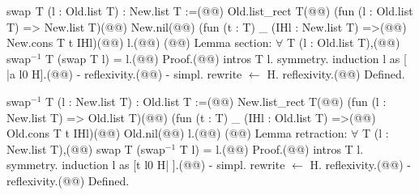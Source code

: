 swap$\phantom{^{2}}$T (l : Old.list T) : New.list T :=(@\vspace{-0.04cm}@)
  Old.list_rect T(@\vspace{-0.04cm}@)
    (fun (l : Old.list T) => New.list T)(@\vspace{-0.04cm}@)
    New.nil(@\vspace{-0.04cm}@)
    (fun (t : T) _ (IHl : New.list T) =>(@\vspace{-0.04cm}@)
      New.cons T t IHl)(@\vspace{-0.04cm}@)
    l.(@\vspace{-0.04cm}@)
(@\vspace{-0.04cm}@)
Lemma section: $\forall$ T (l : Old.list T),(@\vspace{-0.04cm}@)
  swap$^{-1}$ T (swap T l) = l.(@\vspace{-0.04cm}@)
Proof.(@\vspace{-0.04cm}@)
  intros T l. symmetry. induction l as [ |a l0 H].(@\vspace{-0.04cm}@)
  - reflexivity.(@\vspace{-0.04cm}@)
  - simpl. rewrite $\leftarrow$ H. reflexivity.(@\vspace{-0.04cm}@)
Defined.

swap$^{-1}$ T (l : New.list T) : Old.list T :=(@\vspace{-0.04cm}@)
  New.list_rect T(@\vspace{-0.04cm}@)
    (fun (l : New.list T) => Old.list T)(@\vspace{-0.04cm}@)
    (fun (t : T) _ (IHl : Old.list T) =>(@\vspace{-0.04cm}@)
      Old.cons T t IHl)(@\vspace{-0.04cm}@)
    Old.nil(@\vspace{-0.04cm}@)
    l.(@\vspace{-0.04cm}@)
(@\vspace{-0.04cm}@)
Lemma retraction: $\forall$ T (l : New.list T),(@\vspace{-0.04cm}@)
  swap T (swap$^{-1}$ T l) = l.(@\vspace{-0.04cm}@)
Proof.(@\vspace{-0.04cm}@)
  intros T l. symmetry. induction l as [t l0 H| ].(@\vspace{-0.04cm}@)
  - simpl. rewrite $\leftarrow$ H. reflexivity.(@\vspace{-0.04cm}@)
  - reflexivity.(@\vspace{-0.04cm}@)
Defined.
